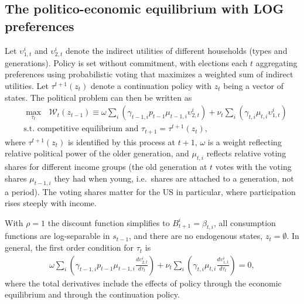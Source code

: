 \subsection{The politico-economic equilibrium with LOG preferences}\label{\refsec:PEELOG}
Let $\upsilon_{1,t}^i$ and $\upsilon_{2,t}^i$ denote the indirect utilities of different households (types and generations). Policy is set without commitment, with elections each $t$ aggregating preferences using probabilistic voting that maximizes a weighted sum of indirect utilities. Let $\tau^{t+1}(z_t)$ denote a continuation policy with $z_t$ being a vector of states. The political problem can then be written as
\begin{align*}
    &\max_{\tau_t}\mbox{ }\mathcal{W}_t(z_{t-1}) \equiv \omega\sum_i\left(\gamma_{t-1,i} p_{t-1} \mu_{t-1,i} \upsilon_{2,t}^i\right)+\nu_t\sum_i\left(\gamma_{t,i}\mu_{t,i} \upsilon_{1,t}^i\right) \\
    &\text{s.t. competitive equilibrium and }\tau_{t+1} = \tau^{t+1}(z_t),
\end{align*}
where $\tau^{t+1}(z_t)$ is identified by this process at $t+1$, $\omega$ is a weight reflecting relative political power of the older generation, and $\mu_{t,i}$ reflects relative voting shares for different income groups (the old generation at $t$ votes with the voting shares $\mu_{t-1,i}$ they had when young, i.e.\ shares are attached to a generation, not a period). The voting shares matter for the US in particular, where participation rises steeply with income.

With $\rho = 1$ the discount function simplifies to $B_{t+1}^i = \beta_{t,i}$, all consumption functions are log-separable in $s_{t-1}$, and there are no endogenous states, $z_t = \emptyset$. In general, the first order condition for $\tau_t$ is
\begin{align*}
    \omega\sum_{i}\left(\gamma_{t-1,i}p_{t-1}\mu_{t-1,i} \frac{d\upsilon_{2,t}^i}{d\tau_t}\right)+
    \nu_t\sum_i\left(\gamma_{t,i}\mu_{t,i} \frac{d\upsilon_{1,t}^i}{d\tau_t}\right) = 0,
\end{align*}
where the total derivatives include the effects of policy through the economic equilibrium and through the continuation policy.

